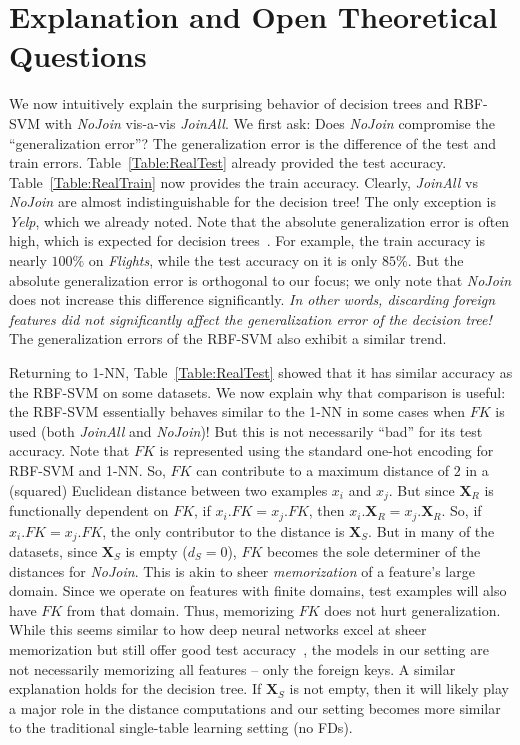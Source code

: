 \documentclass{vldb}
\begin{document}
\section{Explanation and Open Theoretical Questions}

We now intuitively explain the surprising behavior of decision trees and RBF-SVM with \textit{NoJoin} vis-a-vis \textit{JoinAll}.
We first ask: {Does \textit{NoJoin} compromise the ``generalization error''?} The generalization error is the difference of the test and train errors.
Table~\ref{Table:RealTest} already provided the test accuracy. Table~\ref{Table:RealTrain} now provides the train accuracy. Clearly, \textit{JoinAll} vs 
\textit{NoJoin} are almost indistinguishable for the decision tree! The only exception is \textit{Yelp}, which we already noted. 
Note that the absolute generalization error is often high, which is expected for decision trees~\cite{dtreebias2}. 
For example, the train accuracy is nearly $100\%$ on \textit{Flights}, while the test accuracy on it is only $85\%$.
But the absolute generalization error is orthogonal to our focus; we only note that \textit{NoJoin} does not increase this difference significantly.
\textit{In other words, discarding foreign features did not significantly affect the generalization error of the decision tree!} 
The generalization errors of the RBF-SVM also exhibit a similar trend.

Returning to 1-NN, Table~\ref{Table:RealTest} showed that it has similar accuracy as the RBF-SVM on some datasets. We now explain why that comparison is useful: the RBF-SVM 
essentially behaves similar to the 1-NN in some cases when $FK$ is used (both \textit{JoinAll} and \textit{NoJoin})! But this is not necessarily ``bad'' for its test accuracy.
Note that $FK$ is represented using the standard one-hot encoding for RBF-SVM and 1-NN. So, $FK$ can contribute to a maximum distance of $2$ in a (squared) Euclidean distance between 
two examples $x_i$ and $x_j$.
But since $\textbf{X}_R$ is functionally dependent on $FK$, if $x_i.FK = x_j.FK$, then $x_i.\textbf{X}_R = x_j.\textbf{X}_R$. So, if $x_i.FK = x_j.FK$, the only contributor to 
the distance is $\textbf{X}_S$. But in many of the datasets, since $\textbf{X}_S$ is empty ($d_S = 0$), $FK$ becomes the sole determiner of the distances for \textit{NoJoin}.
This is akin to sheer \textit{memorization} of a feature's large domain. Since we operate on features with finite domains, test examples will also have $FK$ from that domain. 
Thus, memorizing $FK$ does not hurt generalization. While this seems similar to how deep neural networks excel at sheer memorization but still offer good test accuracy~\cite{rechtdnn}, 
the models in our setting are not necessarily memorizing all features -- only the foreign keys.
A similar explanation holds for the decision tree. If $\textbf{X}_S$ is not empty, then it will likely play a major role in the distance computations and our setting 
becomes more similar to the traditional single-table learning setting (no FDs).
\end{document}
